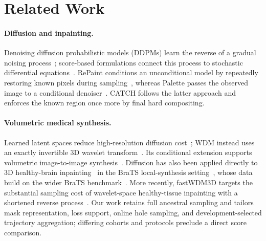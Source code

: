 \section{Related Work}
\label{sec:related-work}

\paragraph{Diffusion and inpainting.}
Denoising diffusion probabilistic models (DDPMs) learn the reverse of a gradual
noising process~\cite{ho2020ddpm}; score-based formulations connect this process to
stochastic differential equations~\cite{song2021scoresde}. RePaint conditions an
unconditional model by repeatedly restoring known pixels during
sampling~\cite{lugmayr2022repaint}, whereas Palette passes the observed image to a
conditional denoiser~\cite{saharia2022palette}. CATCH follows the latter approach
and enforces the known region once more by final hard compositing.

\paragraph{Volumetric medical synthesis.}
Learned latent spaces reduce high-resolution diffusion
cost~\cite{rombach2022ldm}; WDM instead uses an exactly invertible 3D wavelet
transform~\cite{friedrich2024wdm}. Its conditional extension supports volumetric
image-to-image synthesis~\cite{friedrich2024cwdm}. Diffusion has also been applied
directly to 3D healthy-brain inpainting~\cite{durrer2024inpainting} in the BraTS
local-synthesis setting~\cite{kofler2023inpainting}, whose data build on the wider
BraTS benchmark~\cite{menze2015brats,bakas2017advancing,baid2021rsna}. More
recently, fastWDM3D targets the substantial sampling cost of wavelet-space
healthy-tissue inpainting with a shortened reverse
process~\cite{durrer2026fastwdm3d}. Our work retains full ancestral sampling and
tailors mask representation, loss support, online hole sampling, and
development-selected trajectory aggregation; differing cohorts and protocols
preclude a direct score comparison.

